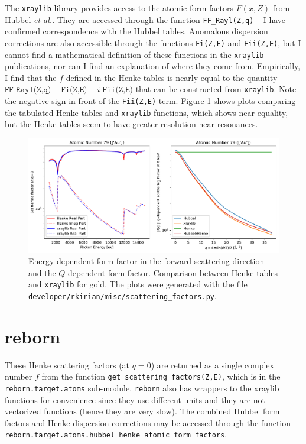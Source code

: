 \documentclass[11pt]{article}
\begin{document}
The \texttt{xraylib} 
library\cite{schoonjansXraylibLibraryXray2011,brunettiLibraryXrayMatter2004} 
provides access to the atomic form factors  $F(x,Z)$  from Hubbel 
{\itshape et al.}\cite{hubbellAtomicFormFactors1975}.  They are accessed 
through the function \texttt{FF\_Rayl(Z,q)} -- I have confirmed 
correspondence with the Hubbel tables.  Anomalous dispersion corrections are 
also  accessible through the functions \texttt{Fi(Z,E)} and \texttt{Fii(Z,E)}, 
but I cannot find a mathematical definition of these functions in the 
\texttt{xraylib} publications, nor can I find an explanation of where they come 
from.   Empirically, I find that the $f$ defined in the Henke tables is nearly 
equal to the quantity $\texttt{FF\_Rayl(Z,q)} + \texttt{Fi(Z,E)} - i\; 
\texttt{Fii(Z,E)}$ that can be constructed from \texttt{xraylib}.  Note the 
negative sign in front of the \texttt{Fii(Z,E)} term.  Figure \ref{fig:forms} 
shows plots comparing the tabulated Henke tables and \texttt{xraylib} functions, 
which shows near equality, but the Henke tables seem to have greater resolution 
near resonances.
\begin{figure}[htbp]
   \centering
   \includegraphics[width=\textwidth]{figures/formfactor_79.pdf} 
   \caption{Energy-dependent form factor in the forward scattering direction and the $Q$-dependent form factor.
   Comparison between Henke tables and \texttt{xraylib} for gold.  The plots were generated with the file
   \texttt{developer/rkirian/misc/scattering\_factors.py}.}
   \label{fig:forms}
\end{figure} 


\section{reborn}

These Henke scattering factors (at $q=0$) are returned as a single complex number $f$ from the function
\texttt{get\_scattering\_factors(Z,E)}, which is in the \texttt{reborn.target.atoms} sub-module.
\texttt{reborn} also has wrappers to the xraylib functions for convenience since they use different
units and they are not vectorized functions (hence they are very slow).  The combined Hubbel form
factors and Henke dispersion corrections may be accessed through the function
\texttt{reborn.target.atoms.hubbel\_henke\_atomic\_form\_factors}.
\end{document}
